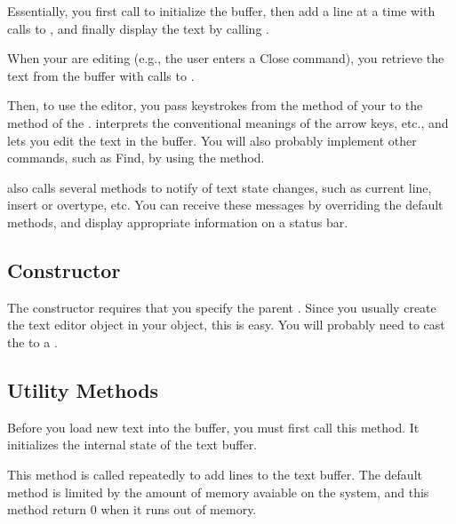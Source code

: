 Essentially, you first call  to initialize the
buffer, then add a line at a time with calls to ,
and finally display the text by calling .

When your are editing (e.g., the user enters a Close command),
you retrieve the text from the  buffer
with calls to .

Then, to use the editor, you pass keystrokes from the
 method of your  to the 
method of the .  interprets
the conventional meanings of the arrow keys, etc., and lets
you edit the text in the buffer. You will also probably implement
other commands, such as Find, by using the 
method.

 also calls several methods to notify of
text state changes, such as current line, insert or overtype,
etc. You can receive these messages by overriding the default
methods, and display appropriate information on a status bar.

\subsection* {Constructor} %


The  constructor requires that you specify
the parent . Since you usually create the text editor object
in your  object, this is easy. You will probably need
to cast the  to a .

\subsection* {Utility Methods} %


Before you load new text into the buffer, you must first
call this method. It initializes the internal state of
the text buffer.


This method is called repeatedly to add lines to the
text buffer. The default method is limited by the amount
of memory avaiable on the system, and this method
return 0 when it runs out of memory.

